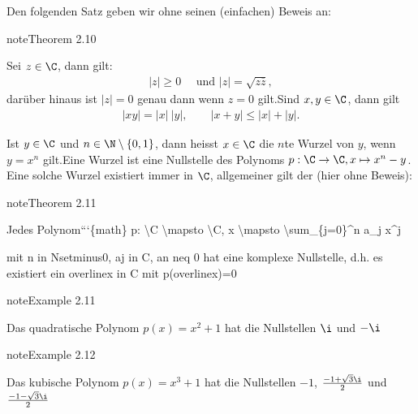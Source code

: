 \documentclass[letterpaper,10pt,english]{jupyterBook}
\begin{document}
Den folgenden Satz geben wir ohne seinen (einfachen) Beweis an:
\label{grundlagen/zahlensysteme:theorem-30}
\begin{sphinxadmonition}{note}{Theorem 2.10}



Sei \(z \in \C \), dann gilt:
\begin{equation*}
\begin{split}  |z| \geq 0\quad \text{ und } |z|=\sqrt{z \overline{z}},\end{split}
\end{equation*}
darüber hinaus ist \(|z|=0\) genau dann wenn \(z=0\) gilt.Sind \(x,y \in \C\), dann gilt
\begin{equation*}
\begin{split} |xy|=|x|~|y|,\qquad |x+y| \leq |x|+|y| .\end{split}
\end{equation*}\end{sphinxadmonition}

Ist \(y \in \C\) und \(n\in \N\setminus\{0,1\}\), dann heisst \(x \in \C\) die \(n\)\sphinxhyphen{}te Wurzel von \(y\), wenn \(y=x^n\) gilt.Eine Wurzel ist eine Nullstelle des Polynoms \(p:\C \rightarrow \C, x \mapsto x^n-y\). Eine solche Wurzel existiert immer in \(\C\), allgemeiner gilt der  (hier ohne Beweis):
\label{grundlagen/zahlensysteme:theorem-31}
\begin{sphinxadmonition}{note}{Theorem 2.11}



Jedes Polynom```\{math\}
p: \textbackslash{}C \textbackslash{}mapsto \textbackslash{}C, x \textbackslash{}mapsto \textbackslash{}sum\_\{j=0\}\textasciicircum{}n a\_j x\textasciicircum{}j

\begin{sphinxVerbatim}[commandchars=\\\{\}]

mit \PYGZdl{}n \PYGZbs{}in \PYGZbs{}N\PYGZbs{}setminus\PYGZbs{}\PYGZob{}0\PYGZbs{}\PYGZcb{}\PYGZdl{}, \PYGZdl{}a\PYGZus{}j \PYGZbs{}in \PYGZbs{}C\PYGZdl{}, \PYGZdl{}a\PYGZus{}n \PYGZbs{}neq 0\PYGZdl{} hat eine komplexe Nullstelle, d.h. es existiert ein \PYGZdl{}\PYGZbs{}overline\PYGZob{}x\PYGZcb{} \PYGZbs{}in \PYGZbs{}C\PYGZdl{} mit \PYGZdl{}p(\PYGZbs{}overline\PYGZob{}x\PYGZcb{})=0\PYGZdl{}
\end{sphinxVerbatim}
\end{sphinxadmonition}
\label{grundlagen/zahlensysteme:example-32}
\begin{sphinxadmonition}{note}{Example 2.11}



Das quadratische Polynom \(p(x) =x^2+1\) hat die Nullstellen \(\i\) und \(-\i\)
\end{sphinxadmonition}
\label{grundlagen/zahlensysteme:example-33}
\begin{sphinxadmonition}{note}{Example 2.12}



Das kubische Polynom \(p(x) =x^3+1\) hat die Nullstellen \(-1\), \(\frac{-1+\sqrt{3}\i}2\) und \(\frac{-1-\sqrt{3}\i}2\)
\end{sphinxadmonition}
\end{document}
